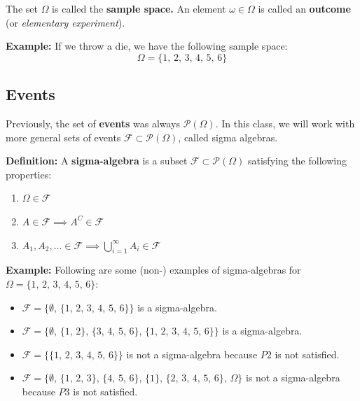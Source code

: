 \documentclass[a4paper]{extarticle}
\begin{document}
The set \(\Omega\) is called the \textbf{sample space.} An element \(\omega \in \Omega\) is called an \textbf{outcome} (or \textit{elementary experiment}).

\begin{ebox}
    \textbf{Example:} If we throw a die, we have the following sample space:
    \[
        \Omega = \{1, \, 2, \, 3, \, 4, \, 5, \, 6\}  
    \]
\end{ebox}

\subsection{Events}

Previously, the set of \textbf{events} was always \(\mathcal{P}(\Omega)\). In this class, we will work with more general sets of events \(\mathcal{F} \subset \mathcal{P}(\Omega)\), called sigma algebras.

\textbf{Definition:} A \textbf{sigma-algebra} is a subset \(\mathcal{F} \subset \mathcal{P}(\Omega)\) satisfying the following properties:

\begin{enumerate}
    \item \(\Omega \in \mathcal{F}\)
    \item \(A \in \mathcal{F} \implies A^C \in \mathcal{F}\)
    \item \(A_1, A_2,... \in \mathcal{F} \implies \bigcup_{i = 1}^{\infty} A_i \in \mathcal{F}\)
\end{enumerate}

\begin{ebox}
    \textbf{Example:} Following are some (non-) examples of sigma-algebras for \(\Omega = \{1, \, 2, \, 3, \, 4, \, 5, \, 6\}\):

    \begin{itemize}
        \item \(\mathcal{F} = \{\emptyset, \, \{1, \, 2, \, 3, \, 4, \, 5, \, 6\}\}\) is a sigma-algebra.
        \item \(\mathcal{F} = \{\emptyset, \, \{1, \, 2\}, \, \{3, \, 4, \, 5, \, 6\}, \, \{1, \, 2, \, 3, \, 4, \, 5, \, 6\}\}\) is a sigma-algebra.
        \item \(\mathcal{F} = \{\{1, \, 2, \, 3, \, 4, \, 5, \, 6\}\}\) is not a sigma-algebra because \(P2\) is not satisfied.
        \item \(\mathcal{F} = \{\emptyset, \, \{1, \, 2, \, 3\}, \, \{4, \, 5, \, 6\}, \, \{1\}, \, \{2, \, 3, \, 4, \, 5, \, 6\}, \, \Omega\}\) is not a sigma-algebra because \(P3\) is not satisfied.
    \end{itemize}
\end{ebox}
\end{document}
